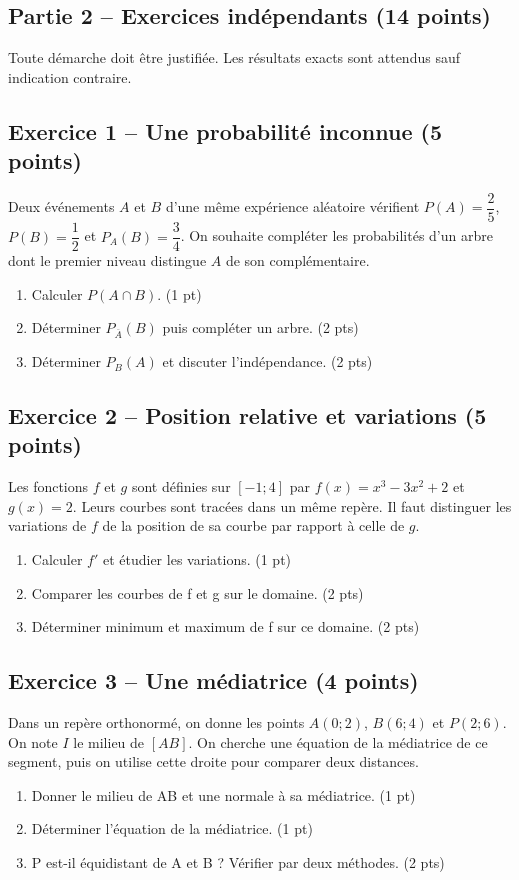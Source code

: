 \clearpage\subsection*{Partie 2 -- Exercices indépendants (14 points)}
Toute démarche doit être justifiée. Les résultats exacts sont attendus sauf indication contraire.
\subsection*{Exercice 1 -- Une probabilité inconnue (5 points)}
Deux événements $A$ et $B$ d’une même expérience aléatoire vérifient $P(A)=\dfrac25$, $P(B)=\dfrac12$ et $P_A(B)=\dfrac34$. On souhaite compléter les probabilités d’un arbre dont le premier niveau distingue $A$ de son complémentaire.
\begin{enumerate}
\item Calculer $P(A\cap B)$. \hfill(1 pt)
\item Déterminer $P_{\overline A}(B)$ puis compléter un arbre. \hfill(2 pts)
\item Déterminer $P_B(A)$ et discuter l’indépendance. \hfill(2 pts)
\end{enumerate}
\subsection*{Exercice 2 -- Position relative et variations (5 points)}
Les fonctions $f$ et $g$ sont définies sur $[-1;4]$ par $f(x)=x^3-3x^2+2$ et $g(x)=2$. Leurs courbes sont tracées dans un même repère. Il faut distinguer les variations de $f$ de la position de sa courbe par rapport à celle de $g$.
\begin{enumerate}
\item Calculer $f\prime$ et étudier les variations. \hfill(1 pt)
\item Comparer les courbes de f et g sur le domaine. \hfill(2 pts)
\item Déterminer minimum et maximum de f sur ce domaine. \hfill(2 pts)
\end{enumerate}
\subsection*{Exercice 3 -- Une médiatrice (4 points)}
Dans un repère orthonormé, on donne les points $A(0;2)$, $B(6;4)$ et $P(2;6)$. On note $I$ le milieu de $[AB]$. On cherche une équation de la médiatrice de ce segment, puis on utilise cette droite pour comparer deux distances.
\begin{enumerate}
\item Donner le milieu de AB et une normale à sa médiatrice. \hfill(1 pt)
\item Déterminer l’équation de la médiatrice. \hfill(1 pt)
\item P est-il équidistant de A et B ? Vérifier par deux méthodes. \hfill(2 pts)
\end{enumerate}
